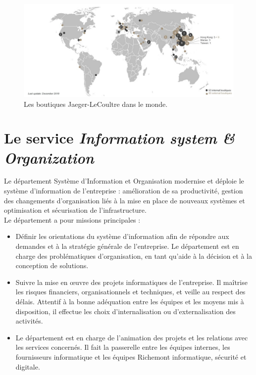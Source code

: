\begin{figure}[ht]
    \centering
    \includegraphics[width=\textwidth]{images/boutiques.jpg}
    \caption{Les boutiques Jaeger-LeCoultre dans le monde.}
    \label{fig:boutiques}
\end{figure}



\section{Le service \textit{Information system \& Organization}}
Le département Système d’Information et Organisation modernise et déploie le système d’information de l’entreprise : amélioration de sa productivité, gestion des changements d’organisation liés à la mise en place de nouveaux systèmes et optimisation et sécurisation de l’infrastructure. \\

Le département a pour missions principales : \\
\begin{itemize}
    \item Définir les orientations du système d’information afin de répondre aux demandes et à la stratégie générale de l’entreprise. Le département est en charge des problématiques d’organisation, en tant qu’aide à la décision et à la conception de solutions.
    \item Suivre la mise en œuvre des projets informatiques de l’entreprise. Il maîtrise les risques financiers, organisationnels et techniques, et veille au respect des délais. Attentif à la bonne adéquation entre les équipes et les moyens mis à disposition, il effectue les choix d’internalisation ou d’externalisation des activités.
    \item Le département est en charge de l’animation des projets et les relations avec les services concernés. Il fait la passerelle entre les équipes internes, les fournisseurs informatique et les équipes Richemont informatique, sécurité et digitale.\\
\end{itemize}

